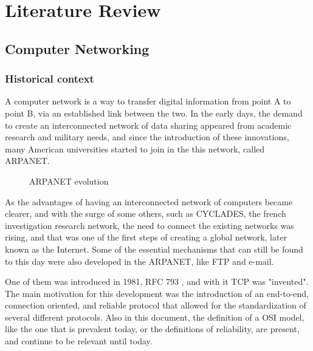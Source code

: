 \chapter{Literature Review} \label{chap:bib} %

\section {Computer Networking}

\subsection {Historical context}
\hspace {5mm} 

A computer network is a way to transfer digital information from point A to point B, via an established link
between the two. In the early days, the demand to create an interconnected network of data sharing 
appeared from academic research and military needs, and since the introduction of these innovations, many 
American universities started to join in the this network, called ARPANET.

\begin{figure}[!tbph]
  \centering
  \hfill
  \caption {ARPANET evolution}
  \label{fig:arpa}
\end{figure}

\par As the advantages of having an interconnected network of computers became clearer, and with the surge of some others, 
such as CYCLADES, the french investigation research network, the need to connect the existing networks was rising, 
and that was one of the first steps of creating a global network, later known as the Internet. Some of the essential mechanisms that can still be found to this day were also developed in the ARPANET, like FTP and e-mail.

\par One of them was introduced in 1981, RFC 793 \cite{postel_transmission_1981}, and with it TCP was "invented".
The main motivation for this development was the introduction of an end-to-end, connection oriented, and reliable protocol that allowed for the standardization of 
several different protocols. Also in this document, the definition of a OSI model, like the one that is prevalent today, or the definitions of reliability, are present, and continue
to be relevant until today.


